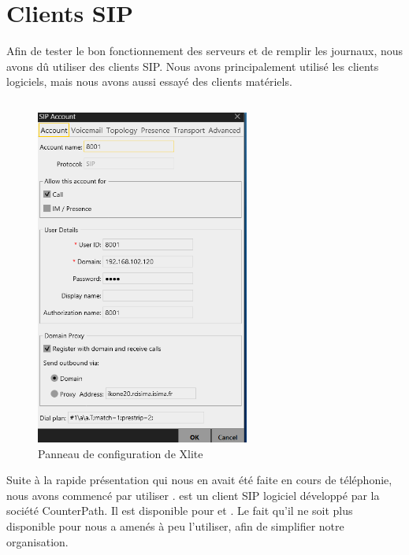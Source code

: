 \section{Clients SIP}

Afin de tester le bon fonctionnement des serveurs et de remplir les journaux, nous avons dû utiliser des clients SIP. Nous avons principalement utilisé les clients logiciels, mais nous avons aussi essayé des clients matériels.

\subsection{\xlite}

\begin{figure}[h]
\begin{center}
\includegraphics[width=7cm]{images/config-xlite.png}
\end{center}
\caption{Panneau de configuration de Xlite}
\end{figure}

Suite à la rapide présentation qui nous en avait été faite en cours de téléphonie, nous avons commencé par utiliser {\xlite}. {\xlite} est un client SIP logiciel développé par la société CounterPath. Il est disponible pour {\win} et {\mac}. Le fait qu’il ne soit plus disponible pour {\lnx} nous a amenés à peu l’utiliser, afin de simplifier notre organisation.


\subsection{\lnp}

